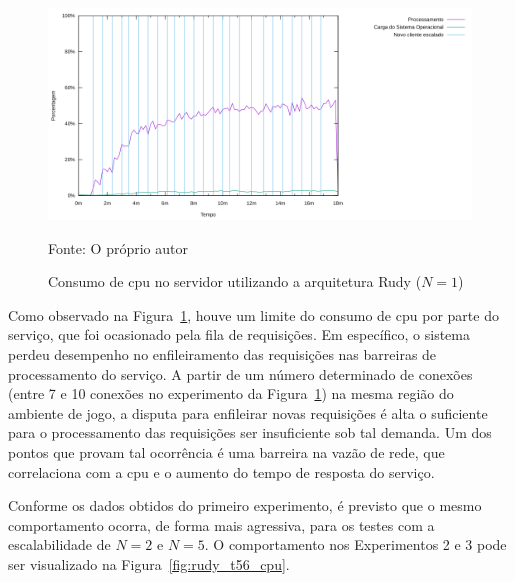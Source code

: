 \begin{figure}[htb!]
    \caption{Consumo de \ac{cpu} no servidor utilizando a arquitetura Rudy ($N=1$)}
    \label{fig:rudy_t4_cpu}
    \includegraphics[width=\textwidth]{metricas_rudy_t4/cpu.png}
    \centering
    
    Fonte: O próprio autor
\end{figure}

Como observado na Figura~\ref{fig:rudy_t4_cpu}, houve um limite do consumo de \ac{cpu} por parte do serviço, que foi ocasionado pela fila de requisições.
%
Em específico, o sistema perdeu desempenho no enfileiramento das requisições nas barreiras de processamento do serviço.
%
A partir de um número determinado de conexões (entre 7 e 10 conexões no experimento da Figura~\ref{fig:rudy_t4_cpu}) na mesma região do ambiente de jogo, a disputa para enfileirar novas requisições é alta o suficiente para o processamento das requisições ser insuficiente sob tal demanda.
%
Um dos pontos que provam tal ocorrência é uma barreira na vazão de rede, que correlaciona com a \ac{cpu} e o aumento do tempo de resposta do serviço.

Conforme os dados obtidos do primeiro experimento, é previsto que o mesmo comportamento ocorra, de forma mais agressiva, para os testes com a escalabilidade de $N=2$ e $N=5$.
%
O comportamento nos Experimentos 2 e 3 pode ser visualizado na Figura~\ref{fig:rudy_t56_cpu}.

